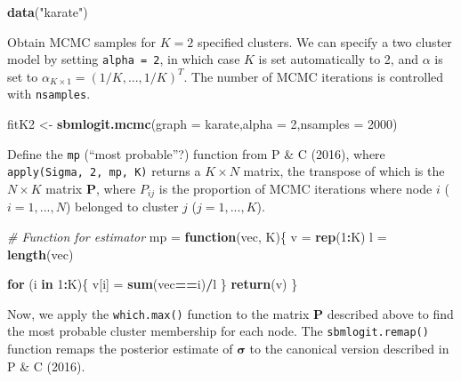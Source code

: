 \documentclass[]{article}
\newenvironment{Shaded}{\begin{snugshade}}{\end{snugshade}}
\newcommand{\CommentTok}[1]{\textcolor[rgb]{0.56,0.35,0.01}{\textit{#1}}}
\newcommand{\ControlFlowTok}[1]{\textcolor[rgb]{0.13,0.29,0.53}{\textbf{#1}}}
\newcommand{\DataTypeTok}[1]{\textcolor[rgb]{0.13,0.29,0.53}{#1}}
\newcommand{\DecValTok}[1]{\textcolor[rgb]{0.00,0.00,0.81}{#1}}
\newcommand{\KeywordTok}[1]{\textcolor[rgb]{0.13,0.29,0.53}{\textbf{#1}}}
\newcommand{\NormalTok}[1]{#1}
\newcommand{\OperatorTok}[1]{\textcolor[rgb]{0.81,0.36,0.00}{\textbf{#1}}}
\newcommand{\StringTok}[1]{\textcolor[rgb]{0.31,0.60,0.02}{#1}}
\begin{document}
\begin{Shaded}
\begin{Highlighting}[]
\KeywordTok{data}\NormalTok{(}\StringTok{"karate"}\NormalTok{)}
\end{Highlighting}
\end{Shaded}

Obtain MCMC samples for \(K = 2\) specified clusters. We can specify a
two cluster model by setting \texttt{alpha\ =\ 2}, in which case \(K\)
is set automatically to 2, and \(\alpha\) is set to
\(\alpha_{K \times 1} = (1/K,...,1/K)^T\). The number of MCMC iterations
is controlled with \texttt{nsamples}.

\begin{Shaded}
\begin{Highlighting}[]
\NormalTok{fitK2 <-}\StringTok{ }\KeywordTok{sbmlogit.mcmc}\NormalTok{(}\DataTypeTok{graph =}\NormalTok{ karate,}\DataTypeTok{alpha =} \DecValTok{2}\NormalTok{,}\DataTypeTok{nsamples =} \DecValTok{2000}\NormalTok{)}
\end{Highlighting}
\end{Shaded}

Define the \texttt{mp} (``most probable''?) function from P \& C (2016),
where \texttt{apply(Sigma,\ 2,\ mp,\ K)} returns a \(K \times N\)
matrix, the transpose of which is the \({N \times K}\) matrix
\(\mathbf{P}\), where \(P_{ij}\) is the proportion of MCMC iterations
where node \(i\) (\(i = 1,...,N\)) belonged to cluster \(j\)
(\(j = 1,...,K\)).

\begin{Shaded}
\begin{Highlighting}[]
\CommentTok{# Function for estimator}
\NormalTok{mp =}\StringTok{ }\ControlFlowTok{function}\NormalTok{(vec, K)\{}
\NormalTok{  v =}\StringTok{ }\KeywordTok{rep}\NormalTok{(}\DecValTok{1}\OperatorTok{:}\NormalTok{K)}
\NormalTok{  l =}\StringTok{ }\KeywordTok{length}\NormalTok{(vec)}
  
  \ControlFlowTok{for}\NormalTok{ (i }\ControlFlowTok{in} \DecValTok{1}\OperatorTok{:}\NormalTok{K)\{}
\NormalTok{    v[i] =}\StringTok{ }\KeywordTok{sum}\NormalTok{(vec}\OperatorTok{==}\NormalTok{i)}\OperatorTok{/}\NormalTok{l}
\NormalTok{  \}}
  \KeywordTok{return}\NormalTok{(v)}
\NormalTok{\}}
\end{Highlighting}
\end{Shaded}

Now, we apply the \texttt{which.max()} function to the matrix
\(\mathbf{P}\) described above to find the most probable cluster
membership for each node. The \texttt{sbmlogit.remap()} function remaps
the posterior estimate of \(\boldsymbol\sigma\) to the canonical version
described in P \& C (2016).
\end{document}
